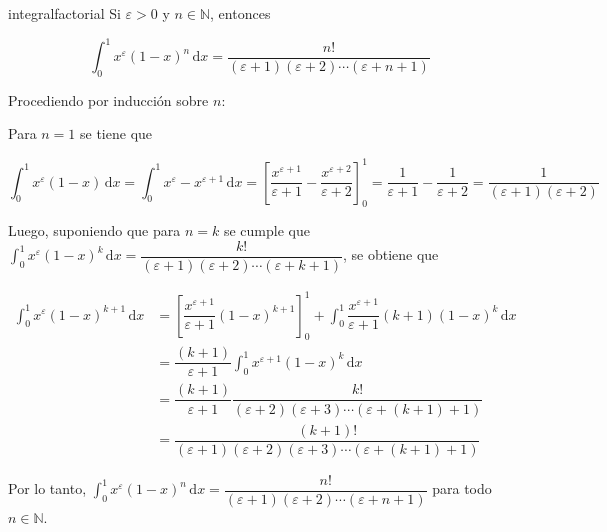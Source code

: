 \documentclass[fleqn]{article}
\newenvironment{lema}[2]{\begin{lem}[breakable, pad at break = 5mm, leftrule = 0.7mm, rightrule = 0.7mm, right = 2mm, left = 2mm, enlarge bottom finally by = 3mm, fontupper = \setlength{\parskip}{2mm}, fontlower = \setlength{\parskip}{2mm}]{#1}{#2}}{\end{lem}}
\newcommand{\nat}{\mathbb{N}}
\newcommand{\intg}[4]{\int_{#1}^{#2} \!\! #3 \, \mathrm{d} #4}
\begin{document}
	\begin{lema}{}{integralfactorial}
		Si $ \varepsilon > 0 $ y $ n \in \nat $, entonces

		\begin{equation*}
			\intg{0}{1}{x^\varepsilon (1-x)^n}{x} = \dfrac{n!}{(\varepsilon + 1)(\varepsilon + 2) \cdots (\varepsilon + n + 1)}
		\end{equation*}

		\tcblower

		Procediendo por inducción sobre $n$:

		Para $ n = 1 $ se tiene que

		\begin{equation*}
			\intg{0}{1}{x^\varepsilon (1-x)}{x} = \intg{0}{1}{x^\varepsilon - x^{\varepsilon + 1}}{x} = \left[ \dfrac{x^{\varepsilon + 1}}{\varepsilon + 1} - \dfrac{x^{\varepsilon + 2}}{\varepsilon + 2} \right]_0^1 = \dfrac{1}{\varepsilon + 1} - \dfrac{1}{\varepsilon + 2} = \dfrac{1}{(\varepsilon + 1)(\varepsilon + 2)}
		\end{equation*}

		Luego, suponiendo que para $ n = k $ se cumple que $ \displaystyle \intg{0}{1}{x^\varepsilon (1-x)^k}{x} = \dfrac{k!}{(\varepsilon + 1)(\varepsilon + 2) \cdots (\varepsilon + k + 1)} $, se obtiene que

		\begin{align*}
			\intg{0}{1}{x^\varepsilon (1-x)^{k+1}}{x} &= \left[ \dfrac{x^{\varepsilon + 1}}{\varepsilon + 1} (1-x)^{k+1} \right]_0^1 + \intg{0}{1}{\dfrac{x^{\varepsilon + 1}}{\varepsilon + 1} (k+1)(1-x)^k}{x} \\
			&= \dfrac{(k+1)}{\varepsilon + 1} \intg{0}{1}{x^{\varepsilon + 1} (1-x)^k}{x} \\
			&= \dfrac{(k+1)}{\varepsilon + 1} \dfrac{k!}{(\varepsilon + 2)(\varepsilon + 3) \cdots (\varepsilon + (k+1) + 1)} \\
			&= \dfrac{(k+1)!}{(\varepsilon + 1)(\varepsilon + 2)(\varepsilon + 3) \cdots (\varepsilon + (k+1) + 1)}
		\end{align*}

		Por lo tanto, $ \displaystyle \intg{0}{1}{x^\varepsilon (1-x)^n}{x} = \dfrac{n!}{(\varepsilon + 1)(\varepsilon + 2) \cdots (\varepsilon + n + 1)} $ para todo $ n \in \nat $.
	\end{lema}
\end{document}
